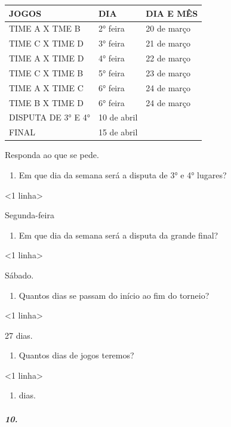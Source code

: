 \begin{longtable}[]{@{}lll@{}}
\toprule
JOGOS & DIA & DIA E MÊS\tabularnewline
\midrule
\endhead
TIME A X TME B & 2° feira & 20 de março\tabularnewline
TIME C X TIME D & 3° feira & 21 de março\tabularnewline
TIME A X TIME D & 4° feira & 22 de março\tabularnewline
TIME C X TIME B & 5° feira & 23 de março\tabularnewline
TIME A X TIME C & 6° feira & 24 de março\tabularnewline
TIME B X TIME D & 6° feira & 24 de março\tabularnewline
DISPUTA DE 3° E 4° & 10 de abril\tabularnewline
FINAL & 15 de abril\tabularnewline
\bottomrule
\end{longtable}

Responda ao que se pede.

\begin{enumerate}
\def\labelenumi{\alph{enumi})}
\item
  Em que dia da semana será a disputa de 3° e 4° lugares?
\end{enumerate}

\textless{}1 linha\textgreater{}

Segunda-feira

\begin{enumerate}
\def\labelenumi{\alph{enumi})}
\item
  Em que dia da semana será a disputa da grande final?
\end{enumerate}

\textless{}1 linha\textgreater{}

Sábado.

\begin{enumerate}
\def\labelenumi{\alph{enumi})}
\item
  Quantos dias se passam do início ao fim do torneio?
\end{enumerate}

\textless{}1 linha\textgreater{}

27 dias.

\begin{enumerate}
\def\labelenumi{\alph{enumi})}
\item
  Quantos dias de jogos teremos?
\end{enumerate}

\textless{}1 linha\textgreater{}

\begin{enumerate}
\def\labelenumi{\arabic{enumi}.}
\setcounter{enumi}{7}
\item
  dias.
\end{enumerate}

\subparagraph{10.}\label{section-52}

